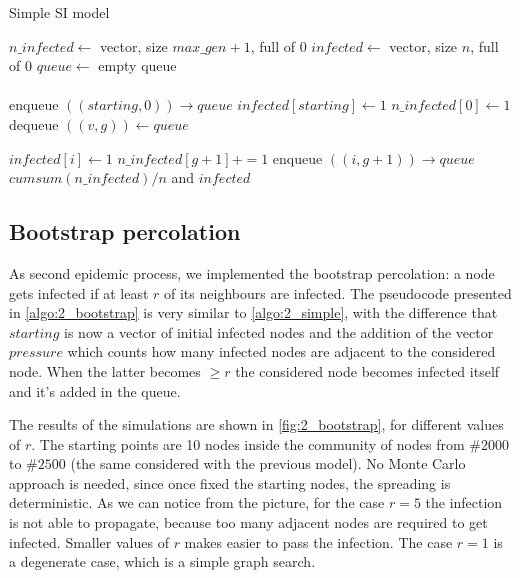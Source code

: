 \begin{algorithm}[!ht]
	\caption{Simple SI model}
	\label{algo:2_simple}
	\begin{algorithmic}[1]
		
		\State $n\_infected \gets$ vector, size $max\_gen+1$, full of $0$
		\State $infected \gets$ vector, size $n$, full of $0$
		\State $queue \gets$ empty queue\\
		\\
		
		\State enqueue $((starting, 0)) \to queue$
		\State $infected[starting] \gets 1$
		\State $n\_infected[0] \gets 1$	
		\\
		\State dequeue $((v,g)) \gets queue$
		
		 
		\State $infected[i] \gets 1$
		\State $n\_infected[g+1]+=1$				
		\State enqueue $((i, g+1)) \to queue$
		\EndIf
		\EndFor
		\EndWhile
		\\	
		\State \Return $cumsum(n\_infected)/n$ and $infected$
		\EndFunction
	\end{algorithmic}
\end{algorithm}

\subsection{Bootstrap percolation}\label{sec:2_boot}

As second epidemic process, we implemented the bootstrap percolation: a node gets infected if at least $r$ of its neighbours are infected. 
The pseudocode presented in \cref{algo:2_bootstrap} is very similar to \cref{algo:2_simple}, with the difference that $starting$ is now a vector of initial infected nodes and the addition of the vector $pressure$ which counts how many infected nodes are adjacent to the considered node. When the latter becomes $\ge r$ the considered node becomes infected itself and it's added in the queue.

The results of the simulations are shown in \cref{fig:2_bootstrap}, for different values of $r$. The starting points are 10 nodes inside the community of nodes from $\#2000$ to $\#2500$ (the same considered with the previous model). No Monte Carlo approach is needed, since once fixed the starting nodes, the spreading is deterministic. As we can notice from the picture, for the case $r=5$ the infection is not able to propagate, because too many adjacent nodes are required to get infected. Smaller values of $r$ makes easier to pass the infection. The case $r=1$ is a degenerate case, which is a simple graph search.

